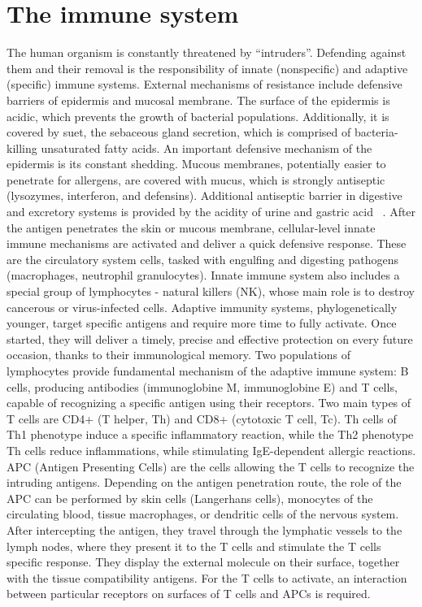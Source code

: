 \documentclass[10pt,oneside]{memoir}
\begin{document}
\chapter{The immune system}
\label{theimmunesystem}

The human organism is constantly threatened by ``intruders''. Defending against them and their removal is the responsibility of innate (nonspecific) and adaptive (specific) immune systems. External mechanisms of resistance include defensive barriers of epidermis and mucosal membrane.
The surface of the epidermis is acidic, which prevents the growth of bacterial populations. Additionally, it is covered by suet, the sebaceous gland secretion, which is comprised of bacteria-killing unsaturated fatty acids. An important defensive mechanism of the epidermis is its constant shedding.
Mucous membranes, potentially easier to penetrate for allergens, are covered with mucus, which is strongly antiseptic (lysozymes, interferon, and defensins). Additional antiseptic barrier in digestive and excretory systems is provided by the acidity of urine and gastric acid ~\cite{Resmedica:UkladImmunologiczny}.
After the antigen penetrates the skin or mucous membrane, cellular-level innate immune mechanisms are activated and deliver a quick defensive response. These are the circulatory system cells, tasked with engulfing and digesting pathogens (macrophages, neutrophil granulocytes). Innate immune system also includes a special group of lymphocytes - natural killers (NK), whose main role is to destroy cancerous or virus-infected cells.
Adaptive immunity systems, phylogenetically younger, target specific antigens and require more time to fully activate. Once started, they will deliver a timely, precise and effective protection on every future occasion, thanks to their immunological memory. Two populations of lymphocytes provide fundamental mechanism of the adaptive immune system: B cells, producing antibodies (immunoglobine M, immunoglobine E) and T cells, capable of  recognizing a specific antigen using their receptors. Two main types of T cells are CD4+ (T helper, Th) and CD8+ (cytotoxic T cell, Tc). Th cells of Th1 phenotype induce a specific inflammatory reaction, while the Th2 phenotype Th cells reduce inflammations, while stimulating IgE-dependent allergic reactions.
APC (Antigen Presenting Cells) are the cells allowing the T cells to recognize the intruding antigens. Depending on the antigen penetration route, the role of the APC can be performed by skin cells (Langerhans cells), monocytes of the circulating blood, tissue macrophages, or dendritic cells of the nervous system. After intercepting the antigen, they travel through the lymphatic vessels to the lymph nodes, where they present it to the T cells and stimulate the T cells specific response. They display the external molecule on their surface, together with the tissue compatibility antigens. For the T cells to activate, an interaction between particular receptors on surfaces of T cells and APCs is required.
\end{document}
